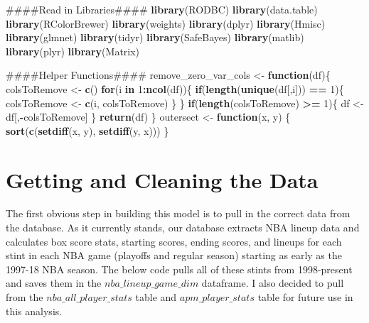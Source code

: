 \documentclass[]{article}
\newenvironment{Shaded}{\begin{snugshade}}{\end{snugshade}}
\newcommand{\KeywordTok}[1]{\textcolor[rgb]{0.13,0.29,0.53}{\textbf{#1}}}
\newcommand{\DecValTok}[1]{\textcolor[rgb]{0.00,0.00,0.81}{#1}}
\newcommand{\StringTok}[1]{\textcolor[rgb]{0.31,0.60,0.02}{#1}}
\newcommand{\ControlFlowTok}[1]{\textcolor[rgb]{0.13,0.29,0.53}{\textbf{#1}}}
\newcommand{\OperatorTok}[1]{\textcolor[rgb]{0.81,0.36,0.00}{\textbf{#1}}}
\newcommand{\NormalTok}[1]{#1}
\begin{document}
\begin{Shaded}
\begin{Highlighting}[]
\NormalTok{####Read in Libraries####}
\KeywordTok{library}\NormalTok{(RODBC)}
\KeywordTok{library}\NormalTok{(data.table)}
\KeywordTok{library}\NormalTok{(RColorBrewer)}
\KeywordTok{library}\NormalTok{(weights)}
\KeywordTok{library}\NormalTok{(dplyr)}
\KeywordTok{library}\NormalTok{(Hmisc)}
\KeywordTok{library}\NormalTok{(glmnet)}
\KeywordTok{library}\NormalTok{(tidyr)}
\KeywordTok{library}\NormalTok{(SafeBayes)}
\KeywordTok{library}\NormalTok{(matlib)}
\KeywordTok{library}\NormalTok{(plyr)}
\KeywordTok{library}\NormalTok{(Matrix)}

\NormalTok{####Helper Functions####}
\NormalTok{remove_zero_var_cols <-}\StringTok{ }\ControlFlowTok{function}\NormalTok{(df)\{}
\NormalTok{  colsToRemove <-}\StringTok{ }\KeywordTok{c}\NormalTok{()}
  \ControlFlowTok{for}\NormalTok{(i }\ControlFlowTok{in} \DecValTok{1}\OperatorTok{:}\KeywordTok{ncol}\NormalTok{(df))\{}
    \ControlFlowTok{if}\NormalTok{(}\KeywordTok{length}\NormalTok{(}\KeywordTok{unique}\NormalTok{(df[,i])) }\OperatorTok{==}\StringTok{ }\DecValTok{1}\NormalTok{)\{}
\NormalTok{      colsToRemove <-}\StringTok{ }\KeywordTok{c}\NormalTok{(i, colsToRemove)}
\NormalTok{    \}}
\NormalTok{  \}}
  \ControlFlowTok{if}\NormalTok{(}\KeywordTok{length}\NormalTok{(colsToRemove) }\OperatorTok{>=}\StringTok{ }\DecValTok{1}\NormalTok{)\{}
\NormalTok{    df <-}\StringTok{ }\NormalTok{df[,}\OperatorTok{-}\NormalTok{colsToRemove]}
\NormalTok{  \}}
  \KeywordTok{return}\NormalTok{(df)}
\NormalTok{\}}
\NormalTok{outersect <-}\StringTok{ }\ControlFlowTok{function}\NormalTok{(x, y) \{}
  \KeywordTok{sort}\NormalTok{(}\KeywordTok{c}\NormalTok{(}\KeywordTok{setdiff}\NormalTok{(x, y),}
         \KeywordTok{setdiff}\NormalTok{(y, x)))}
\NormalTok{\}}
\end{Highlighting}
\end{Shaded}

\section{Getting and Cleaning the Data}

The first obvious step in building this model is to pull in the correct
data from the database. As it currently stands, our database extracts
NBA lineup data and calculates box score stats, starting scores, ending
scores, and lineups for each stint in each NBA game (playoffs and
regular season) starting as early as the 1997-18 NBA season. The below
code pulls all of these stints from 1998-present and saves them in the
\(nba\_lineup\_game\_dim\) dataframe. I also decided to pull from the
\(nba\_all\_player\_stats\) table and \(apm\_player\_stats\) table for
future use in this analysis.
\end{document}
